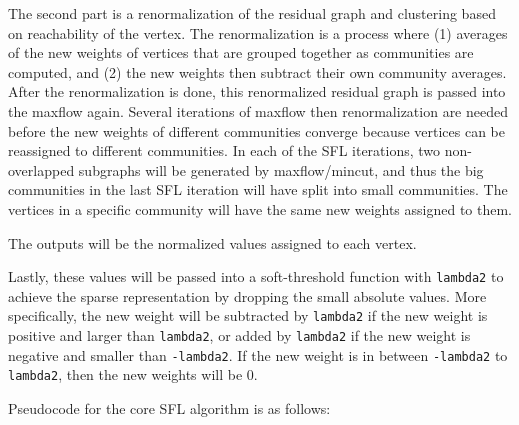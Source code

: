 \documentclass[10pt,oneside]{memoir}
\begin{document}
The second part is a renormalization of the residual graph and
clustering based on reachability of the vertex. The renormalization is a
process where (1) averages of the new weights of vertices that are
grouped together as communities are computed, and (2) the new weights
then subtract their own community averages. After the renormalization is
done, this renormalized residual graph is passed into the maxflow again.
Several iterations of maxflow then renormalization are needed before the
new weights of different communities converge because vertices can be
reassigned to different communities. In each of the SFL iterations, two
non-overlapped subgraphs will be generated by maxflow/mincut, and thus
the big communities in the last SFL iteration will have split into small
communities. The vertices in a specific community will have the same new
weights assigned to them.

The outputs will be the normalized values assigned to each vertex.

Lastly, these values will be passed into a soft-threshold function with
\texttt{lambda2} to achieve the sparse representation by dropping the
small absolute values. More specifically, the new weight will be
subtracted by \texttt{lambda2} if the new weight is positive and larger
than \texttt{lambda2}, or added by \texttt{lambda2} if the new weight is
negative and smaller than \texttt{-lambda2}. If the new weight is in
between \texttt{-lambda2} to \texttt{lambda2}, then the new weights will
be 0.

Pseudocode for the core SFL algorithm is as follows:
\end{document}
